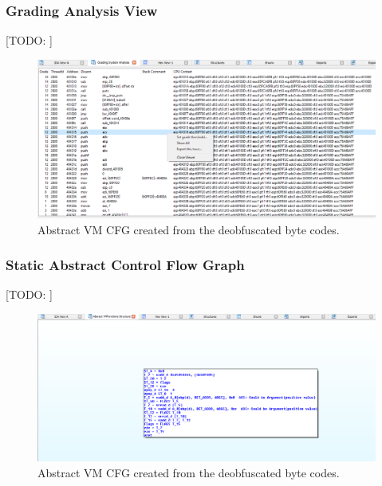 \documentclass[10pt,twoside,a4paper,bibliography=totoc]{scrbook}
\newcommand{\todo}[1]{{\color{magenta} [TODO: #1]}}
\begin{document}
\subsubsection{Grading Analysis View}
\todo{}
\begin{figure}[H]
\centering
\includegraphics[scale=0.60]{images/ch3/grading1.png}
\caption{Abstract VM CFG created from the deobfuscated byte codes.}
\label{}
\end{figure}

\subsubsection{Static Abstract Control Flow Graph}
\todo{}
\begin{figure}[H]
\centering
\includegraphics[scale=0.60]{images/ch3/ab_vm_graph.png}
\caption{Abstract VM CFG created from the deobfuscated byte codes.}
\label{}
\end{figure}
\end{document}
